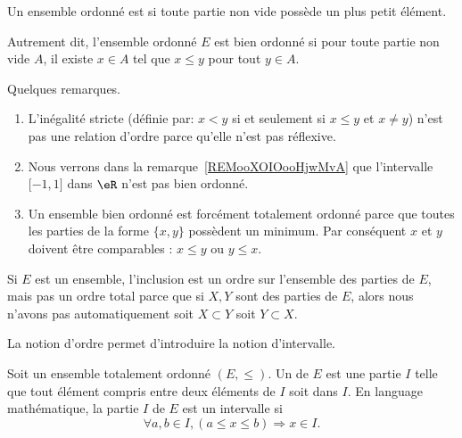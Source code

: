 \begin{definition}   \label{DEFooLJEAooBLGsiS}
    Un ensemble ordonné est  si toute partie non vide possède un plus petit élément.
\end{definition}

Autrement dit, l'ensemble ordonné \( E\) est bien ordonné si pour toute partie non vide \( A\), il existe \( x\in A\) tel que \( x\leq y\) pour tout \( y\in A\).

\begin{normaltext}
    Quelques remarques.
    \begin{enumerate}
        \item
            L'inégalité stricte (définie par: \( x<y\) si et seulement si \( x\leq y\) et \( x\neq y\)) n'est pas une relation d'ordre parce qu'elle n'est pas réflexive.
        \item
            Nous verrons dans la remarque~\ref{REMooXOIOooHjwMvA} que l'intervalle \( \mathopen[ -1 , 1 \mathclose]\) dans \( \eR\) n'est pas bien ordonné.
        \item
            Un ensemble bien ordonné est forcément totalement ordonné parce que toutes les parties de la forme \( \{ x,y \}\) possèdent un minimum. Par conséquent \( x\) et \( y\) doivent être comparables : \( x\leq y\) ou \( y\leq x\).
    \end{enumerate}
\end{normaltext}

\begin{example}
    Si \( E\) est un ensemble, l'inclusion est un ordre sur l'ensemble des parties de \( E\), mais pas un ordre total parce que si \( X,Y\) sont des parties de \( E\), alors nous n'avons pas automatiquement soit \( X\subset Y\) soit \( Y\subset X\).
\end{example}

La notion d'ordre permet d'introduire la notion d'intervalle.

\begin{definition}  \label{DefEYAooMYYTz}
    Soit un ensemble totalement ordonné \( (E,\leq)\). Un  de \( E\) est une partie \( I\) telle que tout élément compris entre deux éléments de \( I \) soit dans \( I \). En language mathématique, la partie \( I \) de \( E\) est un intervalle si
    \[
      \forall a,b\in I,(a\leq x\leq b)\Rightarrow x\in I.
    \]
\end{definition}

